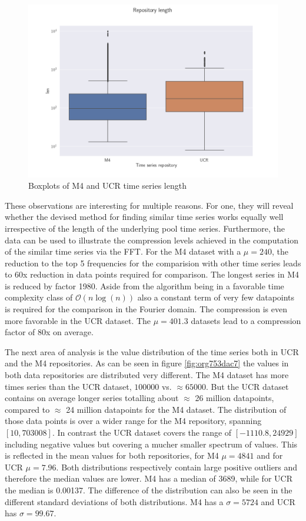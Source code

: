 \documentclass[phd,black, hidelinks]{PrincetonThesis}
\begin{document}
\begin{figure}[htbp]
\centering
\includegraphics[width=.9\linewidth]{./img/ts_len_m4_ucr_boxp.png}
\caption{\label{fig:org254ae4b}Boxplots of M4 and UCR time series length}
\end{figure}

These observations are interesting for multiple reasons. For one, they will reveal whether the devised method for finding similar time series works equally well irrespective of the length of the underlying pool time series. Furthermore, the data can be used to illustrate the compression levels achieved in the computation of the similar time series via the FFT. For the M4 dataset with a \(\mu=240\), the reduction to the top 5 frequencies for the comparision with other time series leads to 60x reduction in data points required for comparison. The longest series in M4 is reduced by factor 1980. Aside from the algorithm being in a favorable time complexity class of \(\mathcal{O}(n\log(n))\) also a constant term of very few datapoints is required for the comparison in the Fourier domain. The compression is even more favorable in the UCR dataset. The \(\mu=401.3\) datasets lead to a compression factor of 80x on average.

The next area of analysis is the value distribution of the time series both in UCR and the M4 repositories. As can be seen in figure \ref{fig:org753dac7} the values in both data repositories are distributed very different. The M4 dataset has more times series than the UCR dataset, \(100000\) vs. \(\approx 65000\). But the UCR dataset contains on average longer series totalling about \(\approx\) 26 million datapoints, compared to \(\approx\) 24 million datapoints for the M4 dataset. The distribution of those data points is over a wider range for the M4 repository, spanning \([10,703008]\). In contrast the UCR dataset covers the range of \([-1110.8,24929]\) including negative values but covering a mucher smaller spectrum of values. This is reflected in the mean values for both repositories, for M4 \(\mu=4841\) and for UCR \(\mu=7.96\). Both distributions respectively contain large positive outliers and therefore the median values are lower. M4 has a median of 3689, while for UCR the median is 0.00137. The difference of the distribution can also be seen in the different standard deviations of both distributions. M4 has a \(\sigma=5724\) and UCR has \(\sigma=99.67\).
\end{document}
